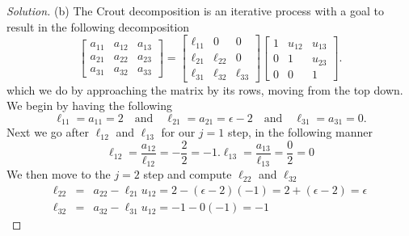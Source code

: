 \documentclass[12pt]{amsart}
\newenvironment{solution}
{\begin{proof}[Solution]}
{\end{proof}}
\begin{document}
\begin{onehalfspace}
\begin{solution}
            (b) The Crout decomposition is an iterative process with a goal to result in the following decomposition
            \begin{displaymath}
                \left[\begin{matrix}
                          a_{11} & a_{12} & a_{13}\\
                          a_{21} & a_{22} & a_{23}\\
                          a_{31} & a_{32} & a_{33}
                \end{matrix}\right] =
                \left[\begin{matrix}
                          \ell_{11} & 0 & 0 \\
                          \ell_{21} & \ell_{22} & 0\\
                          \ell_{31} & \ell_{32} & \ell_{33}
                \end{matrix}\right]
                \left[\begin{matrix}
                          1 & u_{12} & u_{13}\\
                          0 & 1 & u_{23}\\
                          0 & 0 & 1
                \end{matrix}\right].
            \end{displaymath}
             which we do by approaching the matrix by its rows, moving from the top down.
             We begin by having the following
            \begin{displaymath}
                \ell_{11}=a_{11}=2\quad\text{and}\quad\ell_{21}=a_{21}=\epsilon-2\quad\text{and}\quad\ell_{31}=a_{31}=0.
            \end{displaymath}
            Next we go after $\ell_{12}$ and $\ell_{13}$ for our $j=1$ step, in the following manner
            \begin{displaymath}
                \ell_{12} = \frac{a_{12}}{\ell_{12}} = -\frac{2}{2} = -1.
                \ell_{13} = \frac{a_{13}}{\ell_{13}} = \frac{0}{2} = 0
            \end{displaymath}
            We then move to the $j=2$ step and compute $\ell_{22}$ and $\ell_{32}$
            \begin{eqnarray*}
                \ell_{22} & = & a_{22} - \ell_{21}u_{12} = 2 - (\epsilon - 2)(-1) = 2 + (\epsilon -2) = \epsilon\\
                \ell_{32} & = & a_{32} - \ell_{31}u_{12} = -1 - 0(-1) = -1
            \end{eqnarray*}

\end{solution}
\end{onehalfspace}
\end{document}
